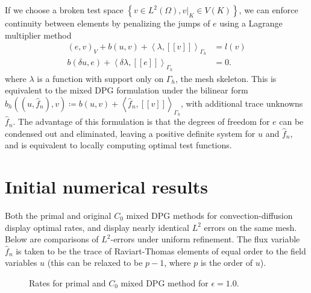 \documentclass[final,leqno]{siamltex}
\newcommand{\LRp}[1]{\left( #1 \right)}
\newcommand{\LRs}[1]{\left[ #1 \right]}
\newcommand{\LRa}[1]{\left\langle #1 \right\rangle}
\newcommand{\LRc}[1]{\left\{ #1 \right\}}
\newcommand{\jump}[1] {\ensuremath{\LRs{\!\left[#1\right]\!}}}
\newcommand{\fnh}{\widehat{f}_n}
\renewcommand{\L}{L^2\LRp{\Omega}}
\newcommand{\Gh}{\Gamma_h}
\begin{document}
If we choose a broken test space $\LRc{ v\in \L, \left.v\right|_K \in V(K)}$, we can enforce continuity between elements by penalizing the jumps of $e$ using a Lagrange multiplier method
\begin{align*}
(e,v)_V + b(u,v) + \LRa{\lambda, \jump{v}}_{\Gh}&= l(v)\\
b(\delta u,e) + \LRa{\delta \lambda, \jump{e}}_{\Gh} &= 0.
\end{align*}
where $\lambda$ is a function with support only on $\Gh$, the mesh skeleton.  This is equivalent to the mixed DPG formulation under the bilinear form $b_h((u,\fnh),v) \coloneqq b(u,v) + \LRa{\fnh, \jump{v}}_{\Gh}$, with additional trace unknowns $\fnh$.  The advantage of this formulation is that the degrees of freedom for $e$ can be condensed out and eliminated, leaving a positive definite system for $u$ and $\fnh$, and is equivalent to locally computing optimal test functions.  

\section{Initial numerical results}

Both the primal and original $C_0$ mixed DPG methods for convection-diffusion display optimal rates, and display nearly identical $L^2$ errors on the same mesh.  Below are comparisons of $L^2$-errors under uniform refinement.  The flux variable $\fnh$ is taken to be the trace of Raviart-Thomas elements of equal order to the field variables $u$ (this can be relaxed to be $p-1$, where $p$ is the order of $u$).  

\begin{figure}[!h]
\centering
{}
\caption{Rates for primal and $C_0$ mixed DPG method for $\epsilon = 1.0$.}
\label{fig:comparison1D}
\end{figure}
\end{document}
